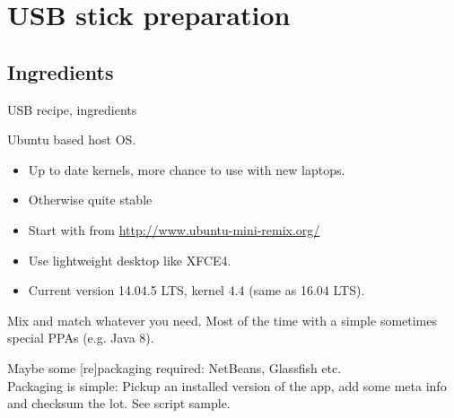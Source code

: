 \section[The cooking]{USB stick preparation}
\subsection{Ingredients}
\begin{frame}{USB recipe, ingredients}
  \begin{description}[short]
  \item[Distribution] Ubuntu based host OS.
    \begin{itemize}
    \item Up to date kernels, more chance to use with new laptops.
    \item Otherwise quite stable
    \item Start with  from
      \url{http://www.ubuntu-mini-remix.org/}
    \item Use lightweight desktop like XFCE4.
    \item Current version 14.04.5 LTS, kernel 4.4 (same as 16.04 LTS).
    \end{itemize}
  \item[Apps]  Mix and match whatever you need. Most of the time with a
    simple  sometimes special PPAs (e.g. Java 8).
  \item[Home grown packages] Maybe some  [re]packaging required:
    NetBeans, Glassfish etc.\\
    Packaging is simple: Pickup an installed version of the app, add some meta
    info and checksum the lot. See script sample.
  \end{description}
\end{frame}

